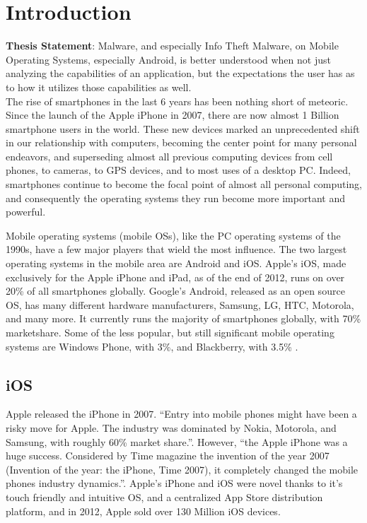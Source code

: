 \chapter{Introduction}
\label{sec:intro}

\textbf{Thesis Statement}: Malware, and especially Info Theft Malware, on Mobile Operating Systems, especially Android, is better understood when not just analyzing the capabilities of an application, but the expectations the user has as to how it utilizes those capabilities as well.\\


The rise of smartphones in the last 6 years has been nothing short of meteoric. Since the launch of the Apple iPhone in 2007, there are now almost 1 Billion smartphone users in the world\citep{kpcbinternetreport2012}. These new devices marked an unprecedented shift in our relationship with computers, becoming the center point for many personal endeavors, and superseding almost all previous computing devices from cell phones, to cameras, to GPS devices, and to most uses of a desktop PC\citep{hua2012introduction}. Indeed, smartphones continue to become the focal point of almost all personal computing, and consequently the operating systems they run become more important and powerful.

Mobile operating systems (mobile OSs), like the PC operating systems of the 1990s, have a few major players that wield the most influence. The two largest operating systems in the mobile area are Android and iOS. Apple's iOS, made exclusively for the Apple iPhone and iPad, as of the end of 2012, runs on over 20\%\citep{gartnerq42012} of all smartphones globally. Google's Android, released as an open source OS, has many different hardware manufacturers, Samsung, LG, HTC, Motorola, and many more. It currently runs the majority of smartphones globally, with 70\%\citep{gartnerq42012}  marketshare. Some of the less popular, but still significant mobile operating systems are Windows Phone, with 3\%, and Blackberry, with 3.5\%\citep{gartnerq42012} . 

\section{iOS}
Apple released the iPhone in 2007. ``Entry into mobile phones might have been a risky move for Apple. The industry was dominated by Nokia, Motorola, and Samsung, with roughly 60\% market share.''\citep{yoffie2010apple}. However, ``the Apple iPhone was a huge success. Considered by Time magazine the invention of the year 2007 (Invention of the year: the iPhone, Time 2007), it completely changed the mobile phones industry dynamics.''\citep{reis2012leadership}. Apple's iPhone and iOS were novel thanks to it's touch friendly and intuitive OS, and a centralized App Store distribution platform\citep{yoffie2010apple}, and in 2012, Apple sold over 130 Million iOS devices\citep{gartnerq42012}.

